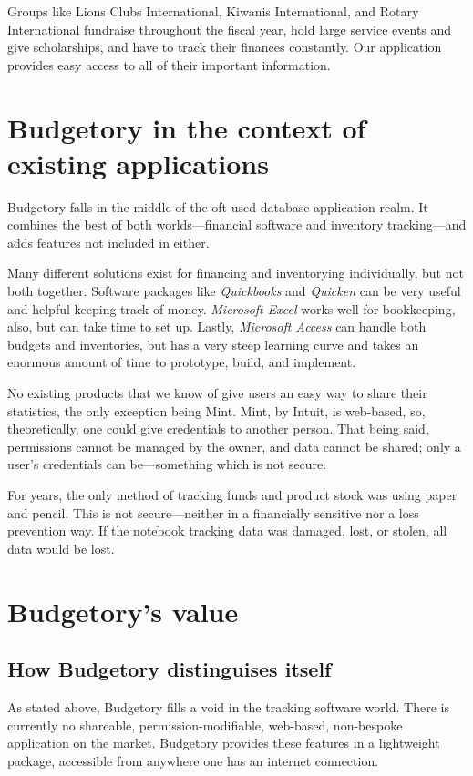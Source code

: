 \documentclass{article}
\begin{document}
Groups like Lions Clubs International, Kiwanis International, and Rotary International fundraise throughout the fiscal year, hold large service events and give scholarships, and have to track their finances constantly. Our application provides easy access to all of their important information.

\vspace{40pt}
\section{\textsf{Budgetory} in the context of existing applications}\label{crossone}
\textsf{Budgetory} falls in the middle of the oft-used database application realm. It combines the best of both worlds---financial software and inventory tracking---and adds features not included in either.

Many different solutions exist for financing and inventorying individually, but not both together. Software packages like \emph{Quickbooks} and \emph{Quicken} can be very useful and helpful keeping track of money. \emph{Microsoft Excel} works well for bookkeeping, also, but can take time to set up. Lastly, \emph{Microsoft Access} can handle both budgets and inventories, but has a very steep learning curve and takes an enormous amount of time to prototype, build, and implement.

No existing products that we know of give users an easy way to share their statistics, the only exception being Mint. Mint, by Intuit, is web-based, so, theoretically, one could give credentials to another person. That being said, permissions cannot be managed by the owner, and data cannot be shared; only a user's credentials can be---something which is not secure.

For years, the only method of tracking funds and product stock was using paper and pencil. This is not secure---neither in a financially sensitive nor a loss prevention way. If the notebook tracking data was damaged, lost, or stolen, all data would be lost.

\vspace{40pt}
\section{\textsf{Budgetory}'s value}
\vspace{20pt}
\subsection{How \textsf{Budgetory} distinguises itself}
As stated above, \textsf{Budgetory} fills a void in the tracking software world. There is currently no shareable, permission-modifiable, web-based, non-bespoke application on the market. \textsf{Budgetory} provides these features in a lightweight package, accessible from anywhere one has an internet connection.
\end{document}
